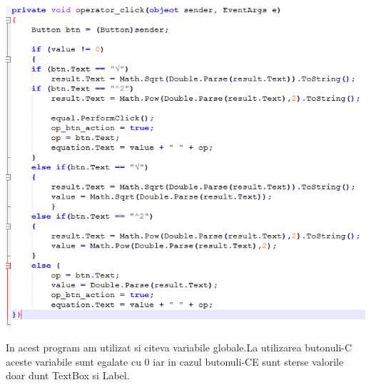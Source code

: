 \begin{flushleft}
\includegraphics[scale=1]{images/operator}
\end{flushleft}

In acest program am utilizat si citeva variabile globale.La utilizarea butonuli-C aceste variabile sunt egalate cu 0 iar in cazul butonuli-CE sunt sterse valorile doar dunt TextBox si Label.\\
\begin{flushleft}



\end{flushleft}


\clearpage